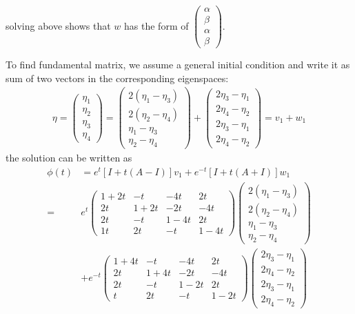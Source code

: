 \documentclass[12pt, letterpaper]{scrartcl}
\begin{document}
solving above shows that $w$ has the form of $\left(\begin{array}{c} \alpha \\ \beta \\ \alpha \\ \beta \end{array}\right)$.

To find fundamental matrix, we assume a general initial condition and write it as sum of two vectors in the corresponding eigenspaces:
\begin{align*}
    \eta=\left(\begin{array}{c} \eta_1 \\ \eta_2 \\ \eta_3 \\ \eta_4 \end{array}\right)=\left(\begin{array}{c} 2(\eta_1-\eta_3) \\ 2(\eta_2-\eta_4) \\ \eta_1-\eta_3 \\ \eta_2-\eta_4 \end{array}\right)
    +
    \left(\begin{array}{c} 2\eta_3-\eta_1 \\ 2\eta_4-\eta_2 \\ 2\eta_3-\eta_1 \\ 2\eta_4-\eta_2 \end{array}\right)
    =
    v_1+w_1
\end{align*}
the solution can be written as
\begin{align*}
    \phi(t)&=e^t[I+t(A-I)]v_1+e^{-t}[I+t(A+I)]w_1\\
    =&e^t\left(\begin{array}{cccc}
        1+2t & -t & -4t & 2t \\
        2t & 1+2t & -2t & -4t\\
        2t & -t & 1-4t & 2t\\
        1t & 2t & -t & 1-4t
    \end{array}\right)\left(\begin{array}{c} 2(\eta_1-\eta_3) \\ 2(\eta_2-\eta_4) \\ \eta_1-\eta_3 \\ \eta_2-\eta_4 \end{array}\right)\\
    &+e^{-t}\left(\begin{array}{cccc}
        1+4t & -t & -4t & 2t \\
        2t & 1+4t & -2t & -4t\\
        2t & -t & 1-2t & 2t\\
        t & 2t & -t & 1-2t
    \end{array}\right)\left(\begin{array}{c} 2\eta_3-\eta_1 \\ 2\eta_4-\eta_2 \\ 2\eta_3-\eta_1 \\ 2\eta_4-\eta_2 \end{array}\right)
    \tag{$*$}
\end{align*}
\end{document}
